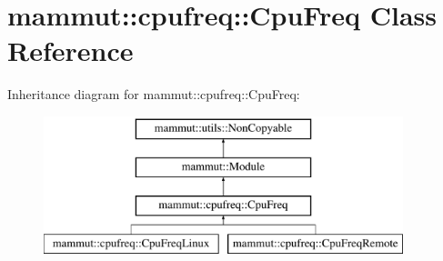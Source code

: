 \hypertarget{classmammut_1_1cpufreq_1_1CpuFreq}{\section{mammut\-:\-:cpufreq\-:\-:Cpu\-Freq Class Reference}
\label{classmammut_1_1cpufreq_1_1CpuFreq}
}
Inheritance diagram for mammut\-:\-:cpufreq\-:\-:Cpu\-Freq\-:\begin{figure}[H]
\begin{center}
\leavevmode
\includegraphics[height=4.000000cm]{classmammut_1_1cpufreq_1_1CpuFreq}
\end{center}
\end{figure}
